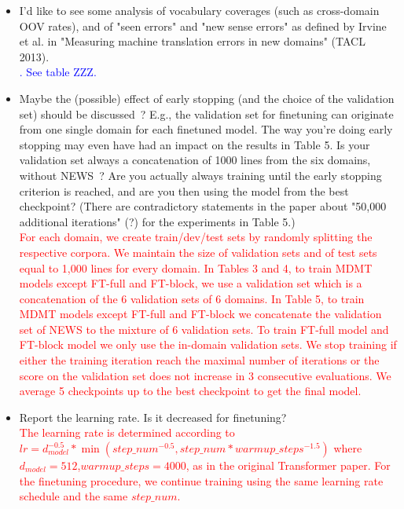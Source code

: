 \documentclass[12pt,times,a4paper,twoside]{article}
\newcommand{\fyTodo}[1]{\Todo[FY:]{\textcolor{orange}{#1}}}
\theoremstyle{definition}
\begin{document}
\begin{itemize}
\item I'd like to see some analysis of vocabulary coverages (such as
cross-domain OOV rates), and of "seen errors" and "new sense errors" as defined by Irvine et al. in "Measuring machine translation errors in new domains" (TACL 2013).
\\
\textcolor{blue}{. See table ZZZ.}\fyTodo{extra experiments to do.}
\\
\item Maybe the (possible) effect of early stopping (and the choice of the validation set) should be discussed~? E.g., the validation set for finetuning can originate from one single domain for each finetuned model. The way you're doing early stopping may even have had an impact on the results in Table 5. Is your validation set always a concatenation of 1000 lines from the six domains, without NEWS~? Are you actually always training until the early stopping criterion is reached, and are you then using the model from the best checkpoint? (There are contradictory statements in the paper about "50,000  additional iterations" (?) for the experiments in Table 5.)
\\
\textcolor{red}{For each domain, we create train/dev/test sets by randomly splitting the respective corpora. We maintain the size of validation sets and of test sets equal to 1,000 lines for every domain. In Tables 3 and 4, to train MDMT models except FT-full and FT-block, we use a validation set which is a concatenation of the 6 validation sets of 6 domains. In Table 5, to train MDMT models except FT-full and FT-block we concatenate the validation set of NEWS to the mixture of 6 validation sets. To train FT-full model and FT-block model we only use the in-domain validation sets. We stop training if either the training iteration reach the maximal number of iterations or the score on the validation set does not increase in 3 consecutive evaluations. We average 5 checkpoints up to the best checkpoint to get the final model.}
\\
\item Report the learning rate. Is it decreased for finetuning?
\\
\textcolor{red}{The learning rate is determined according to $lr = d_{model}^{-0.5}*\min(step\_num^{-0.5},step\_num * warmup\_steps^{-1.5})$ where $d_{model}=512$,$warmup\_steps=4000$, as in the original Transformer paper. For the finetuning procedure, we continue training using the same learning rate schedule and the same $step\_num$.}\fyTodo{Fix this, add comments in appendix}

\end{itemize}
\end{document}
